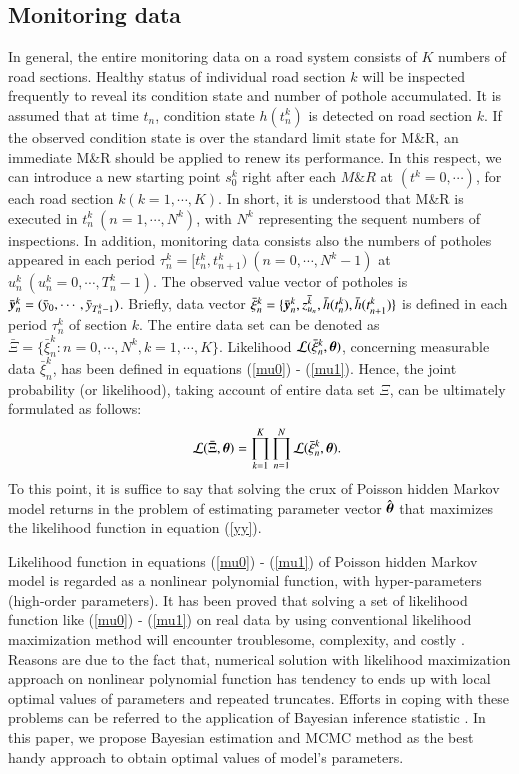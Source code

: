 \documentclass[a4paper,oneside,onecolumn,preprint,10pt,authoryear]{elsarticle}
\begin{document}
\subsection{Monitoring data}
\label{sec51}
In general, the entire monitoring data on a road system consists of $K$ numbers of road sections. Healthy status of individual road section $k$ will be inspected frequently to reveal its condition state and number of pothole accumulated. It is assumed that at time $t_n$, condition state $h(t^k_n)$ is detected on road section $k$. If the observed condition state is over the standard limit state for M\&R, an immediate M\&R should be applied to renew its performance. In this respect, we can introduce a new starting point $s_0^k$ right after each $M\&R$ at $(t^k=0,\cdots)$, for each road section $k (k=1,\cdots,K)$. In short, it is understood that M\&R is executed in $t_n^k~(n=1,\cdots,N^k)$, with $N^k$ representing the sequent numbers of inspections. In addition, monitoring data consists also the numbers of potholes appeared in each period $\tau_n^k=[t_n^k,t_{n+1}^k)~(n=0,\cdots,N^k-1)$ at $u_n^k~(u_n^k=0,\cdots,T^k_n-1)$. The observed value vector of potholes is $\bar{\mbox{\boldmath$y$}}_n^k=(\bar{y}_{0},\cdots,\bar{y}_{T_n^k-1})$. Briefly, data vector $\bar{\xi}_n^k=\{\bar{\mbox{\boldmath$y$}}_n^k,\bar{z^k_{u_n}},\bar{h}(t_n^k),\bar{h}(t_{n+1}^k)\}$ is defined in each period $\tau^k_n$ of section $k$. The entire data set can be denoted as $\bar{\Xi}=\{\bar{\xi}_n^k:n=0,\cdots,N^k,k=1,\cdots,K\}$. Likelihood ${\cal L}(\bar{\xi}_n^k,\mbox{\boldmath$\theta$})$, concerning measurable data $\bar{\xi}_n^k$, has been defined in equations (\ref{mu0}) - (\ref{mu1}). Hence, the joint probability (or likelihood), taking account of entire data set $\Xi$, can be ultimately formulated as follows:
\begin{eqnarray}
&& {\cal L}(\bar{\Xi},\mbox{\boldmath$\theta$}) = \prod_{k=1}^K \prod_{n=1}^{N} {\cal L}(\bar{\xi}_n^k,\mbox{\boldmath$\theta$}). \label{yy}
\end{eqnarray}
To this point, it is suffice to say that solving the crux of Poisson hidden Markov model returns in the problem of estimating parameter vector $\hat{\mbox{\boldmath$\theta$}}$ that maximizes the likelihood function in equation (\ref{yy}).

Likelihood function in equations (\ref{mu0}) - (\ref{mu1}) of Poisson hidden Markov model is regarded as a nonlinear polynomial function, with hyper-parameters (high-order parameters). It has been proved that solving a set of likelihood function like (\ref{mu0}) - (\ref{mu1}) on real data by using conventional likelihood maximization method will encounter troublesome, complexity, and costly \cite{robert}. Reasons are due to the fact that, numerical solution with likelihood maximization approach on nonlinear polynomial function has tendency to ends up with local optimal values of parameters and repeated truncates. Efforts in coping with these problems can be referred to the application of Bayesian inference statistic \cite{titter}. In this paper, we propose Bayesian estimation and MCMC method as the best handy approach to obtain optimal values of model's parameters.
\end{document}

